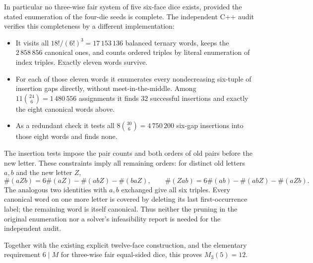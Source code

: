 \documentclass[11pt]{article}
\begin{document}
In particular no three-wise fair system of five six-face dice exists,
provided the stated enumeration of the four-die seeds is complete.
The independent C++ audit  verifies
this completeness by a different implementation:
\begin{itemize}
\item It visits all $18!/(6!)^3=17\,153\,136$ balanced ternary words,
keeps the $2\,858\,856$ canonical ones, and counts ordered triples
by literal enumeration of index triples. Exactly eleven words survive.
\item For each of those eleven words it enumerates every nondecreasing
six-tuple of insertion gaps directly, without meet-in-the-middle.
Among $11\binom{24}{6}=1\,480\,556$ assignments it finds $32$
successful insertions and exactly the eight canonical words above.
\item As a redundant check it tests all $8\binom{30}{6}=4\,750\,200$
six-gap insertions into those eight words and finds none.
\end{itemize}
The insertion tests impose the pair counts and both orders of old pairs
before the new letter. These constraints imply all remaining orders:
for distinct old letters $a,b$ and the new letter $Z$,
\[
 \#(aZb)=6\#(aZ)-\#(abZ)-\#(baZ),\qquad
 \#(Zab)=6\#(ab)-\#(abZ)-\#(aZb).
\]
The analogous two identities with $a,b$ exchanged give all six triples.
Every canonical word on one more letter is covered by deleting its
last first-occurrence label; the remaining word is itself canonical.
Thus neither the pruning in the original enumeration nor a solver's
infeasibility report is needed for the independent audit.

Together with the existing explicit twelve-face construction, and
the elementary requirement $6\mid M$ for three-wise fair equal-sided
dice, this proves $M_3(5)=12$.
\end{document}
